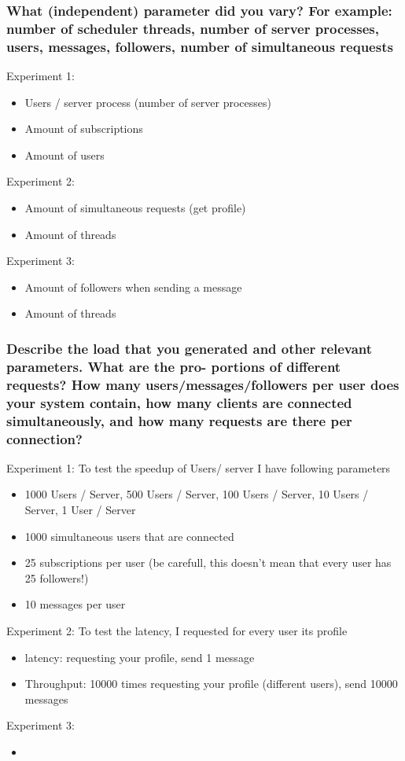 \documentclass[a4paper]{article}
\begin{document}
\subsubsection{What (independent) parameter did you vary? For example: number of scheduler threads,
number of server processes, users, messages, followers, number of simultaneous requests }
		Experiment 1:		
		\begin{itemize}
			\item  Users / server process (number of server processes)
			\item  Amount of subscriptions 
			\item  Amount of users
		\end{itemize}
		Experiment 2:
		\begin{itemize}
			\item Amount of simultaneous requests (get profile)
			\item Amount of threads 
		\end{itemize}
		Experiment 3:
		\begin{itemize}
			\item Amount of followers when sending a message
			\item Amount of threads
		\end{itemize}

\subsubsection{Describe the load that you generated and other relevant parameters. What are the pro-
portions of different requests? How many users/messages/followers per user does your
system contain, how many clients are connected simultaneously, and how many requests
are there per connection?}
        	Experiment 1:
		To test the speedup of Users/ server I have following parameters
		\begin{itemize}
			\item  1000 Users / Server, 500 Users / Server, 100 Users / Server, 10 Users / Server, 1 User / Server 
			\item  1000 simultaneous users that are connected
			\item  25 subscriptions per user (be carefull, this doesn't mean that every user has 25 followers!)
			\item  10 messages per user 
		\end{itemize}
		Experiment 2:
		To test the latency, I requested for every user its profile
		\begin{itemize}
			\item latency: requesting your profile, send 1 message  
			\item Throughput: 10000 times requesting your profile (different users), send 10000 messages 
		\end{itemize}
		Experiment 3:
		\begin{itemize}
			\item 
		\end{itemize}
\end{document}
